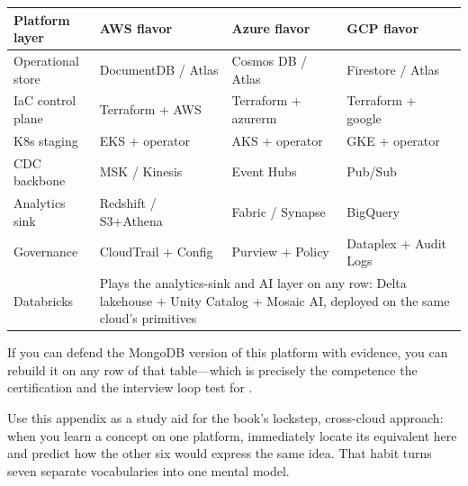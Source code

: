 \begin{center}
\footnotesize
\begin{tabular}{@{}p{2.9cm}p{3.0cm}p{3.0cm}p{3.0cm}@{}}
\toprule
\textbf{Platform layer} & \textbf{AWS flavor} & \textbf{Azure flavor} & \textbf{GCP flavor} \\
\midrule
Operational store & DocumentDB / Atlas & Cosmos DB / Atlas & Firestore / Atlas \\
IaC control plane & Terraform + AWS & Terraform + azurerm & Terraform + google \\
K8s staging & EKS + operator & AKS + operator & GKE + operator \\
CDC backbone & MSK / Kinesis & Event Hubs & Pub/Sub \\
Analytics sink & Redshift / S3+Athena & Fabric / Synapse & BigQuery \\
Governance & CloudTrail + Config & Purview + Policy & Dataplex + Audit Logs \\
\addlinespace
Databricks & \multicolumn{3}{l}{Plays the analytics-sink and AI layer on any row: Delta lakehouse + Unity Catalog + Mosaic AI, deployed on the same cloud's primitives} \\
\bottomrule
\end{tabular}
\end{center}

\noindent If you can defend the MongoDB version of this platform with evidence, you can rebuild it
on any row of that table---which is precisely the competence the certification and the interview
loop test for \cite{mongodbUniversityDocs,kleppmann2017ddia}.

\begin{tipbox}
Use this appendix as a study aid for the book's lockstep, cross-cloud approach: when you learn a
concept on one platform, immediately locate its equivalent here and predict how the other six
would express the same idea. That habit turns seven separate vocabularies into one mental model.
\end{tipbox}

